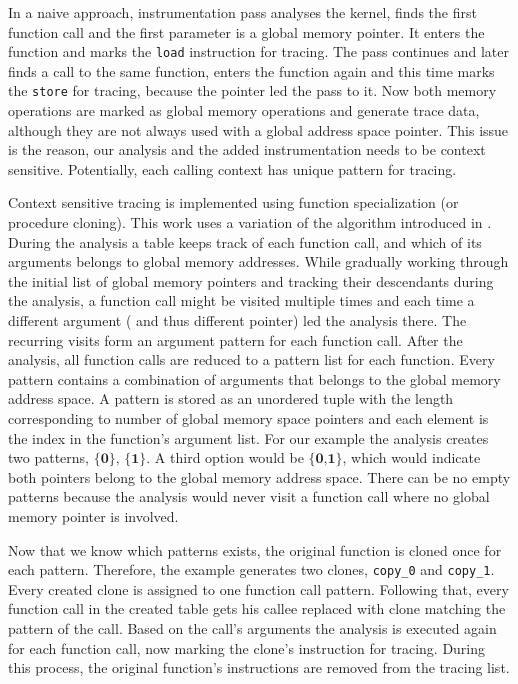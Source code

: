 In a naive approach, instrumentation pass analyses the kernel, finds the first function call and the first
parameter is a global memory pointer. It enters the function and marks the \verb|load| instruction for tracing. The pass continues and later finds a call to the same function, enters the function again and this time marks the \verb|store| for tracing, because the pointer
led the pass to it. Now both memory operations are marked as global memory operations and generate trace data, although they are not always used with a global address space pointer. This issue is the reason, our analysis and the added
instrumentation needs to be context sensitive. Potentially, each calling context has unique pattern for tracing.

Context sensitive tracing is implemented using function specialization (or procedure cloning). This work uses a variation of the algorithm introduced in \cite{Cooper:1993:MPC:2245763.2246020}. During the analysis a table keeps track of each function call, and which of
its arguments belongs to global memory addresses. While gradually working through the initial list of  global memory pointers and tracking their descendants during the analysis, a function call might be visited multiple times and each time a different argument ( and thus different pointer) led the analysis there. The recurring visits form an argument pattern for each function call. After the analysis, all function calls are reduced
to a pattern list for each function. Every pattern contains a combination of arguments that belongs to the global memory address space. A pattern is stored as an unordered tuple with the length corresponding
to number of global memory space pointers and each element is the index in the function's argument list. 
For our example the analysis creates two patterns, $\textbf{\{0\}, \{1\}}$. A third option would be 
 $\textbf{\{0,1\}}$, which would indicate both pointers belong to the global memory address space.
There can be no empty patterns because the analysis would never visit a function call where no global memory pointer is involved.

Now that we know which patterns exists, the original function is cloned once for each pattern. Therefore, the example generates two clones, \verb|copy_0| and \verb|copy_1|. Every created clone is assigned to one function call pattern. Following that, every function call in the created table gets his callee replaced with clone matching the pattern of the call. Based on the call's arguments the analysis is executed again for each function call, now marking the clone's instruction for tracing. During this process, the original function's instructions are removed from the tracing list.

